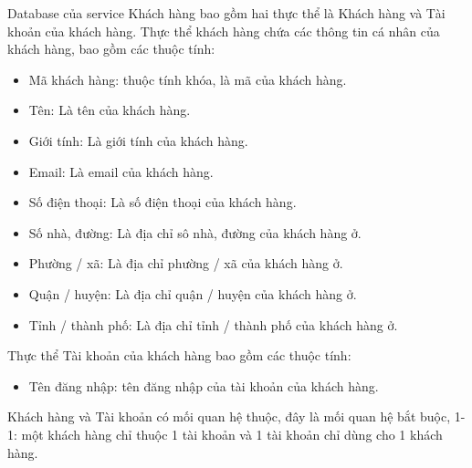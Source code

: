 \par Database của service Khách hàng bao gồm hai thực thể là Khách hàng và Tài khoản của khách hàng. Thực thể khách hàng chứa các thông tin cá nhân của khách hàng, bao gồm các thuộc tính:
\begin{itemize}
    \item Mã khách hàng: thuộc tính khóa, là mã của khách hàng.
    \item Tên: Là tên của khách hàng.
    \item Giới tính: Là giới tính của khách hàng.
    \item Email: Là email của khách hàng.
    \item Số điện thoại: Là số điện thoại của khách hàng.
    \item Số nhà, đường: Là địa chỉ sô nhà, đường của khách hàng ở.
    \item Phường / xã: Là địa chỉ phường / xã của khách hàng ở.
    \item Quận / huyện: Là địa chỉ quận / huyện của khách hàng ở.
    \item Tỉnh / thành phố: Là địa chỉ tỉnh / thành phố của khách hàng ở.
\end{itemize}

\par Thực thể Tài khoản của khách hàng bao gồm các thuộc tính:
\begin{itemize}
    \item Tên đăng nhập: tên đăng nhập của tài khoản của khách hàng.
\end{itemize}

\par Khách hàng và Tài khoản có mối quan hệ thuộc, đây là mối quan hệ bắt buộc, 1-1: một khách hàng chỉ thuộc 1 tài khoản và 1 tài khoản chỉ dùng cho 1 khách hàng.


